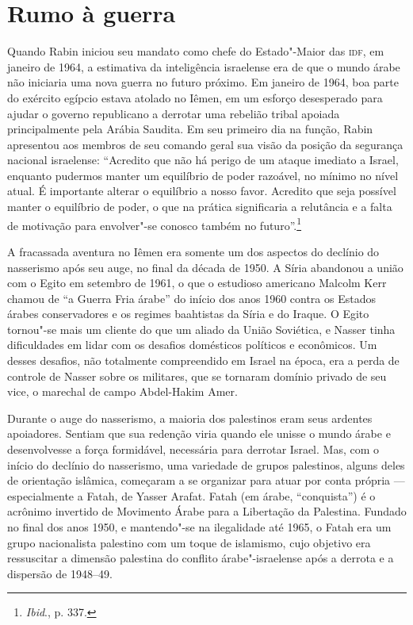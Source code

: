 \section{Rumo à guerra}

Quando Rabin iniciou seu mandato como chefe do Estado"-Maior das \textsc{idf}, em
janeiro de 1964, a estimativa da inteligência israelense era de que o
mundo árabe não iniciaria uma nova guerra no futuro próximo. Em janeiro
de 1964, boa parte do exército egípcio estava atolado no Iêmen, em um
esforço desesperado para ajudar o governo republicano a derrotar uma
rebelião tribal apoiada principalmente pela Arábia Saudita. Em seu
primeiro dia na função, Rabin apresentou aos membros de seu comando
geral sua visão da posição da segurança nacional israelense: ``Acredito
que não há perigo de um ataque imediato a Israel, enquanto pudermos
manter um equilíbrio de poder razoável, no mínimo no nível atual. É
importante alterar o equilíbrio a nosso favor. Acredito que seja
possível manter o equilíbrio de poder, o que na prática significaria a
relutância e a falta de motivação para envolver"-se conosco também no
futuro''.\footnote{\textit{Ibid}., p. 337.}


A fracassada aventura no Iêmen era somente um dos aspectos do declínio
do nasserismo após seu auge, no final da década de 1950. A Síria
abandonou a união com o Egito em setembro de 1961, o que o
estudioso americano Malcolm Kerr chamou de ``a Guerra Fria árabe'' do
início dos anos 1960 contra os Estados árabes conservadores e os regimes
baahtistas da Síria e do Iraque. O Egito tornou"-se mais um cliente do que
um aliado da União Soviética, e Nasser tinha dificuldades em lidar com
os desafios domésticos políticos e econômicos. Um desses desafios, não
totalmente compreendido em Israel na época, era a perda de controle de
Nasser sobre os militares, que se tornaram domínio privado de seu vice,
o marechal de campo Abdel-Hakim Amer.

Durante o auge do nasserismo, a maioria dos palestinos eram seus
ardentes apoiadores. Sentiam que sua redenção viria quando ele
unisse o mundo árabe e desenvolvesse a força formidável, necessária para
derrotar Israel. Mas, com o início do declínio do nasserismo, uma
variedade de grupos palestinos, alguns deles de orientação islâmica,
começaram a se organizar para atuar por conta própria --- especialmente a
Fatah, de Yasser Arafat. Fatah (em árabe, ``conquista'') é o acrônimo
invertido de Movimento Árabe para a Libertação da Palestina. Fundado no
final dos anos 1950, e mantendo"-se na ilegalidade até 1965, o Fatah era
um grupo nacionalista palestino com um toque de islamismo, cujo objetivo
era ressuscitar a dimensão palestina do conflito árabe"-israelense após a
derrota e a dispersão de 1948--49.

